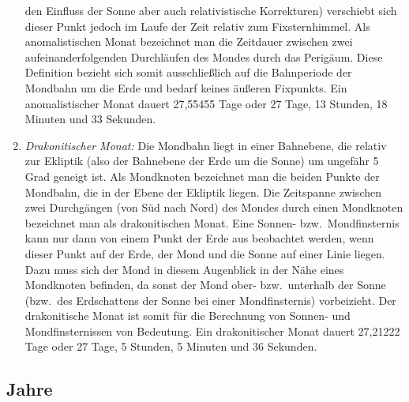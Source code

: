 \begin{enumerate}
den Einfluss der Sonne aber auch relativistische Korrekturen) verschiebt sich dieser Punkt
jedoch im Laufe der Zeit relativ zum Fixsternhimmel. Als anomalistischen Monat bezeichnet man
die Zeitdauer zwischen zwei aufeinanderfolgenden Durchl\"aufen des Mondes durch das
Perig\"aum. Diese Definition bezieht sich somit ausschlie\ss lich auf die Bahnperiode der
Mondbahn um die Erde und bedarf keines \"au\ss eren Fixpunkts. 
Ein anomalistischer Monat dauert 27,55455 Tage oder 27 Tage, 13 Stunden, 18
Minuten und 33 Sekunden. 
\item
\textit{Drakonitischer Monat:}
Die Mondbahn liegt in einer Bahnebene, die relativ zur Ekliptik (also der Bahnebene der
Erde um die Sonne) um ungef\"ahr 5 Grad geneigt ist. Als Mondknoten bezeichnet man
die beiden Punkte der Mondbahn, die in der Ebene der Ekliptik liegen. Die Zeitspanne
zwischen zwei Durchg\"angen (von S\"ud nach Nord) des Mondes durch einen Mondknoten
bezeichnet man als drakonitischen Monat. Eine Sonnen- bzw.\ Mondfinsternis kann nur
dann von einem Punkt der Erde aus beobachtet werden, wenn dieser Punkt auf der Erde, der 
Mond und die
Sonne auf einer Linie liegen. Dazu muss sich der Mond in diesem Augenblick in der
N\"ahe eines Mondknoten befinden, da sonst der Mond ober- bzw.\ unterhalb der Sonne
(bzw.\ des Erdschattens der Sonne bei einer Mondfinsternis) vorbeizieht. Der 
drakonitische Monat ist somit f\"ur die Berechnung von Sonnen- und Mondfinsternissen von
Bedeutung. Ein drakonitischer Monat dauert 27,21222 Tage oder 27 Tage, 5 Stunden, 5
Minuten und 36 Sekunden. 
\end{enumerate}

\subsection{Jahre}

